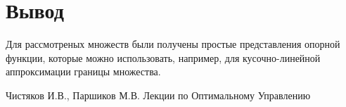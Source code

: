 \documentclass[11pt]{article}
\begin{document}
\section{Вывод}

Для рассмотреных множеств были получены простые представления опорной функции, которые можно использовать, например, для кусочно-линейной аппроксимации границы множества.

\begin{thebibliography}{99}
 Чистяков И.В., Паршиков М.В. Лекции по Оптимальному Управлению
\end{thebibliography}
\end{document}
